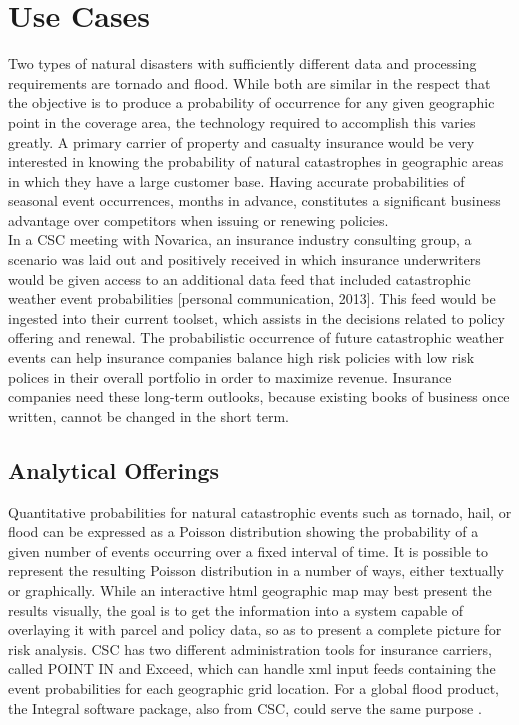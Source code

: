 \section{Use Cases}
Two types of natural disasters with sufficiently different data and processing requirements are tornado and flood. While both are similar in the respect that the objective is to produce a probability of occurrence for any given geographic point in the coverage area, the technology required to accomplish this varies greatly. A primary carrier of property and casualty insurance would be very interested in knowing the probability of natural catastrophes in geographic areas in which they have a large customer base. Having accurate probabilities of seasonal event occurrences, months in advance, constitutes a significant business advantage over competitors when issuing or renewing policies.\\

In a \textsc{CSC} meeting with Novarica, an insurance industry consulting group, a scenario was laid out and positively received in which insurance underwriters would be given access to an additional data feed that included catastrophic weather event probabilities [personal communication, 2013]. This feed would be ingested into their current toolset, which assists in the decisions related to policy offering and renewal. The probabilistic occurrence of future catastrophic weather events can help insurance companies balance high risk policies with low risk polices in their overall portfolio in order to maximize revenue. Insurance companies need these long-term outlooks, because existing books of business once written, cannot be changed in the short term.
\subsection{Analytical Offerings}
Quantitative probabilities for natural catastrophic events such as tornado, hail, or flood can be expressed as a Poisson distribution showing the probability of a given number of events occurring over a fixed interval of time. It is possible to represent the resulting Poisson distribution in a number of ways, either textually or graphically. While an interactive \gls{html} geographic map may best present the results visually, the goal is to get the information into a system capable of overlaying it with parcel and policy data, so as to present a complete picture for risk analysis. \textsc{CSC} has two different administration tools for insurance carriers, called POINT IN and Exceed, which can handle \gls{xml} input feeds containing the event probabilities for each geographic grid location. For a global flood product, the Integral software package, also from \textsc{CSC}, could serve the same purpose \cite{integral}.\\

